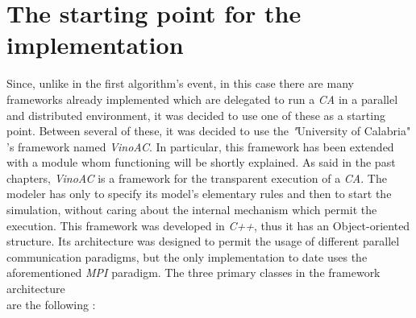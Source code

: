 \documentclass[12pt,a4paper,fleqn]{report}
\begin{document}
\section{The starting point for the implementation}
Since, unlike in the first algorithm's event, in this case there are many frameworks already implemented which are delegated to run a \textit{CA} in a parallel and distributed environment, it was decided to use one of these as a starting point. Between several of these, it was decided to use the \textit"University of Calabria" 's framework named \textit{VinoAC}. In particular, this framework has been extended with a module whom functioning will be shortly explained. As said in the past chapters, \textit{VinoAC} is a framework for the transparent execution of a \textit{CA}. The modeler has only to specify its model's elementary rules and then to start the simulation, without caring about the internal mechanism which permit the execution. This framework was developed in \textit{C++}, thus it has an Object-oriented structure. Its architecture was designed to permit the usage of different parallel communication paradigms, but the only implementation to date uses the aforementioned \textit{MPI} paradigm. The three primary classes in the framework architecture\\
are the following :
\end{document}
